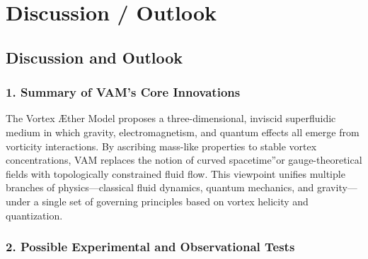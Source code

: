 \section{Discussion / Outlook}

\subsection*{Discussion and Outlook}

\subsubsection*{1. Summary of VAM's Core Innovations}
The Vortex Æther Model proposes a three-dimensional, inviscid superfluidic medium in which gravity, electromagnetism, and quantum effects all emerge from vorticity interactions. By ascribing mass-like properties to stable vortex concentrations, VAM replaces the notion of \grqq curved spacetime\textquotedblright or gauge-theoretical fields with topologically constrained fluid flow. This viewpoint unifies multiple branches of physics—classical fluid dynamics, quantum mechanics, and gravity—under a single set of governing principles based on vortex helicity and quantization.

\subsubsection*{2. Possible Experimental and Observational Tests}

